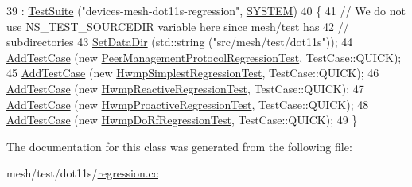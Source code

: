 \begin{DoxyCode}
39                            : \hyperlink{classns3_1_1TestSuite_a904b0c40583b744d30908aeb94636d1a}{TestSuite} (\textcolor{stringliteral}{"devices-mesh-dot11s-regression"}, 
      \hyperlink{classns3_1_1TestSuite_a1ebfcab34ec8161e085e8e3a1855eae0a90c5529a26ab3a5ffcc6e57040dbd82e}{SYSTEM}) 
40   \{
41     \textcolor{comment}{// We do not use NS\_TEST\_SOURCEDIR variable here since mesh/test has }
42     \textcolor{comment}{// subdirectories}
43     \hyperlink{classns3_1_1TestCase_ab002fb0e5071fcde71a92ca9e8224b23}{SetDataDir} (std::string (\textcolor{stringliteral}{"src/mesh/test/dot11s"}));
44     \hyperlink{classns3_1_1TestCase_a3718088e3eefd5d6454569d2e0ddd835}{AddTestCase} (\textcolor{keyword}{new} \hyperlink{classPeerManagementProtocolRegressionTest}{PeerManagementProtocolRegressionTest}, 
      TestCase::QUICK);
45     \hyperlink{classns3_1_1TestCase_a3718088e3eefd5d6454569d2e0ddd835}{AddTestCase} (\textcolor{keyword}{new} \hyperlink{classHwmpSimplestRegressionTest}{HwmpSimplestRegressionTest}, TestCase::QUICK);
46     \hyperlink{classns3_1_1TestCase_a3718088e3eefd5d6454569d2e0ddd835}{AddTestCase} (\textcolor{keyword}{new} \hyperlink{classHwmpReactiveRegressionTest}{HwmpReactiveRegressionTest}, TestCase::QUICK);
47     \hyperlink{classns3_1_1TestCase_a3718088e3eefd5d6454569d2e0ddd835}{AddTestCase} (\textcolor{keyword}{new} \hyperlink{classHwmpProactiveRegressionTest}{HwmpProactiveRegressionTest}, TestCase::QUICK);
48     \hyperlink{classns3_1_1TestCase_a3718088e3eefd5d6454569d2e0ddd835}{AddTestCase} (\textcolor{keyword}{new} \hyperlink{classHwmpDoRfRegressionTest}{HwmpDoRfRegressionTest}, TestCase::QUICK);
49   \}
\end{DoxyCode}


The documentation for this class was generated from the following file\+:\begin{DoxyCompactItemize}
\item 
mesh/test/dot11s/\hyperlink{dot11s_2regression_8cc}{regression.\+cc}\end{DoxyCompactItemize}
